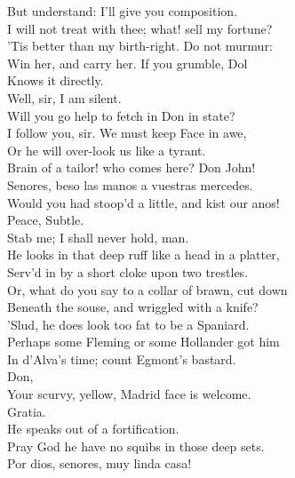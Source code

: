 \documentclass{memoir}
\begin{document}
\begin{drama*}
 But understand: I'll give you composition.\\
\subtlespeaks  I will not treat with thee; what! sell my fortune?\\
 'Tis better than my birth-right. Do not murmur:\\
 Win her, and carry her. If you grumble, Dol\\
 Knows it directly.\\
\facespeaks {} Well, sir, I am silent.\\
 Will you go help to fetch in Don in state?\\
\subtlespeaks  I follow you, sir. We must keep Face in awe,\\
 Or he will over-look us like a tyrant.\\
 Brain of a tailor! who comes here? Don John!\\
\surlyspeaks  Senores, beso las manos a vuestras mercedes.\\
\subtlespeaks  Would you had stoop'd a little, and kist our anos!\\
\facespeaks  Peace, Subtle.\\
\subtlespeaks {} Stab me; I shall never hold, man.\\
 He looks in that deep ruff like a head in a platter,\\
 Serv'd in by a short cloke upon two trestles.\\
\facespeaks  Or, what do you say to a collar of brawn, cut down\\
 Beneath the souse, and wriggled with a knife?\\
\subtlespeaks  'Slud, he does look too fat to be a Spaniard.\\
\facespeaks  Perhaps some Fleming or some Hollander got him\\
 In d'Alva's time; count Egmont's bastard.\\
\subtlespeaks {} Don,\\
 Your scurvy, yellow, Madrid face is welcome.\\
\surlyspeaks  Gratia.\\
\subtlespeaks {} He speaks out of a fortification.\\
 Pray God he have no squibs in those deep sets.\\
\surlyspeaks  Por dios, senores, muy linda casa!\\

\end{drama*}
\end{document}
